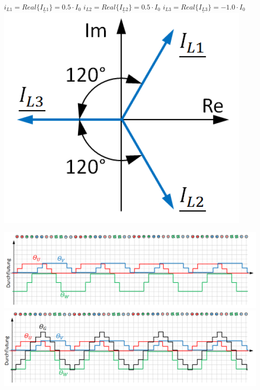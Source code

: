 \begin{minipage}{\linewidth}
    \begin{minipage}{0.4\linewidth}
        $i_{L1} = Real\{\underline{I_{L1}}\} = 0.5\cdot I_0$ \newline \newline
        $i_{L2} = Real\{\underline{I_{L2}}\} = 0.5\cdot I_0$ \newline \newline
        $i_{L3} = Real\{\underline{I_{L3}}\} = -1.0\cdot I_0$ \newline \newline
        \includegraphics[scale = 0.4]{images/StromdreieckAGS}
    \end{minipage}
    \hspace{-1cm}
    \begin{minipage}{0.4\linewidth}
        \includegraphics[scale = 0.35]{images/Durchflutung3} \newline
        \includegraphics[scale = 0.35]{images/Durchflutung4} \newline
    \end{minipage}
\end{minipage}


\clearpage